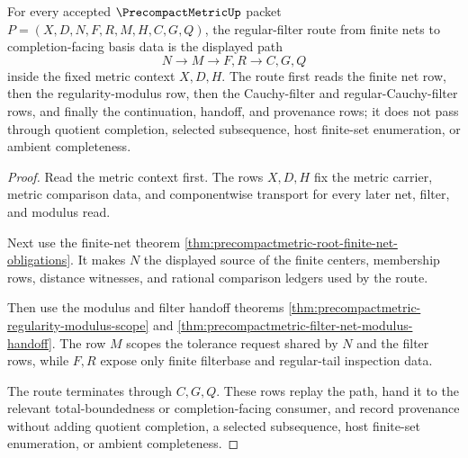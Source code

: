 \begin{theorem}
\label{thm:precompactmetric-regular-filter-finite-net-route}
For every accepted $\PrecompactMetricUp$ packet $P=(X,D,N,F,R,M,H,C,G,Q)$, the regular-filter route from finite nets to completion-facing basis data is the displayed path
$$
N \longrightarrow M \longrightarrow F,R \longrightarrow C,G,Q
$$
inside the fixed metric context $X,D,H$. The route first reads the finite net row, then the regularity-modulus row, then the Cauchy-filter and regular-Cauchy-filter rows, and finally the continuation, handoff, and provenance rows; it does not pass through quotient completion, selected subsequence, host finite-set enumeration, or ambient completeness.
\end{theorem}
\begin{proof}
Read the metric context first. The rows $X,D,H$ fix the metric carrier, metric comparison data, and componentwise transport for every later net, filter, and modulus read.

Next use the finite-net theorem \autoref{thm:precompactmetric-root-finite-net-obligations}. It makes $N$ the displayed source of the finite centers, membership rows, distance witnesses, and rational comparison ledgers used by the route.

Then use the modulus and filter handoff theorems \autoref{thm:precompactmetric-regularity-modulus-scope} and \autoref{thm:precompactmetric-filter-net-modulus-handoff}. The row $M$ scopes the tolerance request shared by $N$ and the filter rows, while $F,R$ expose only finite filterbase and regular-tail inspection data.

The route terminates through $C,G,Q$. These rows replay the path, hand it to the relevant total-boundedness or completion-facing consumer, and record provenance without adding quotient completion, a selected subsequence, host finite-set enumeration, or ambient completeness.
\end{proof}

